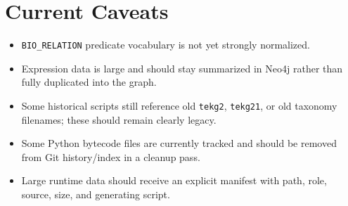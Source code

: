 \documentclass[UTF8]{ctexart}
\begin{document}
\section{Current Caveats}

\begin{itemize}
  \item \texttt{BIO\_RELATION} predicate vocabulary is not yet strongly normalized.
  \item Expression data is large and should stay summarized in Neo4j rather than fully duplicated into the graph.
  \item Some historical scripts still reference old \texttt{tekg2}, \texttt{tekg21}, or old taxonomy filenames; these should remain clearly legacy.
  \item Some Python bytecode files are currently tracked and should be removed from Git history/index in a cleanup pass.
  \item Large runtime data should receive an explicit manifest with path, role, source, size, and generating script.
\end{itemize}
\end{document}

